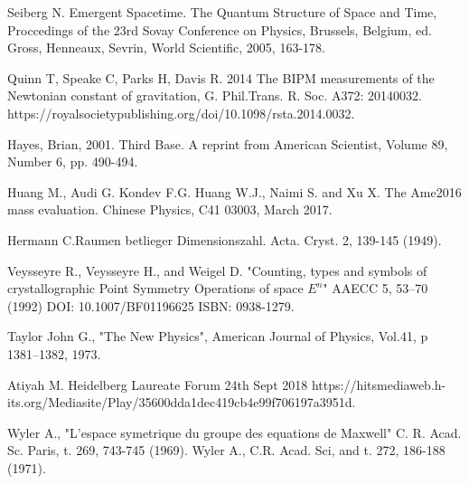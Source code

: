 \documentclass[a4paper,9pt]{article}
\begin{document}
\begin{thebibliography}{99}
 Seiberg N. Emergent Spacetime. The Quantum Structure of Space and Time, Proccedings of the 23rd Sovay Conference on Physics, Brussels, Belgium, ed. Gross, Henneaux, Sevrin, World Scientific, 2005, 163-178.


 Quinn T, Speake C, Parks H, Davis R. 2014 The BIPM measurements of the Newtonian constant of gravitation, G. Phil.Trans. R. Soc. A372: 20140032. https://royalsocietypublishing.org/doi/10.1098/rsta.2014.0032.


 Hayes, Brian, 2001. Third Base. A reprint from American Scientist, Volume 89, Number 6, pp. 490-494. 


 Huang M., Audi G. Kondev F.G. Huang W.J., Naimi S. and Xu X. The Ame2016 mass evaluation. Chinese Physics, C41 03003, March 2017.

 Hermann C.Raumen betlieger Dimensionszahl. Acta. Cryst. 2, 139-145 (1949). 

 Veysseyre R., Veysseyre H., and Weigel D. "Counting, types and symbols of crystallographic Point Symmetry Operations of space $E^{n}$" AAECC 5, 53--70 (1992) DOI: 10.1007/BF01196625 ISBN: 0938-1279.

 Taylor John G., "The New Physics", American Journal of Physics, Vol.41, p 1381--1382, 1973. 

 Atiyah M. Heidelberg Laureate Forum 24th Sept 2018 https://hitsmediaweb.h-its.org/Mediasite/Play/35600dda1dec419cb4e99f706197a3951d.




 Wyler A., "L'espace symetrique du groupe des equations de Maxwell" C. R. Acad. Sc. Paris, t. 269, 743-745 (1969). Wyler A., C.R. Acad. Sci, and t. 272, 186-188 (1971).



\end{thebibliography}
\end{document}
